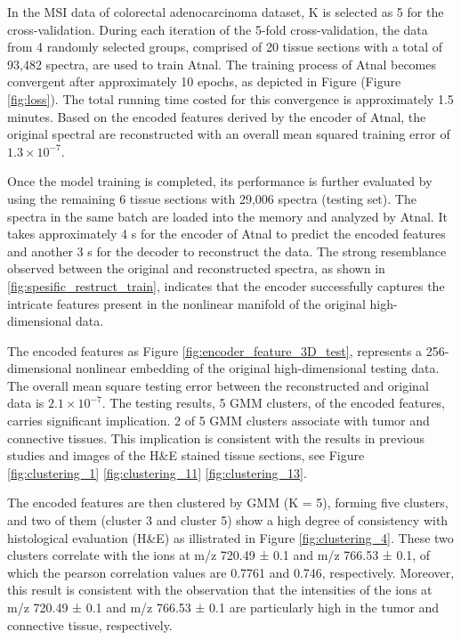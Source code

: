 \documentclass[journal=jacsat,manuscript=article]{achemso}
\begin{document}
In the MSI data of colorectal adenocarcinoma
dataset, K is selected as 5 for the cross-validation. During 
each iteration of the 5-fold cross-validation, the data from 4 randomly selected groups, 
comprised of 20 tissue sections with a total of 93,482 spectra, 
are used to train Atnal. 
The training process of Atnal becomes convergent after approximately 10 epochs, 
as depicted in Figure (Figure \ref{fig:loss}). The total running time costed for this 
convergence is approximately 1.5 minutes. Based on the encoded features derived by 
the encoder of Atnal, the original spectral are 
reconstructed with an overall mean squared training error of $1.3 \times 10^{-7}$. 

Once the model training is completed, its performance is further evaluated by 
using the remaining 6 tissue sections with 29,006 spectra (testing set).
The spectra in the same batch 
are loaded into the memory and analyzed by Atnal. 
It takes approximately 4 s for the encoder of Atnal
to predict the encoded features and another 3 s for the decoder 
to reconstruct the data. 
The strong resemblance observed between the original and reconstructed spectra, 
as shown in \ref{fig:spesific_restruct_train}, indicates that the encoder 
successfully captures the intricate features present in the nonlinear 
manifold of the original high-dimensional data.

The encoded features as Figure \ref{fig:encoder_feature_3D_test}, represents a 
256-dimensional nonlinear embedding of the original high-dimensional testing data. 
The overall mean square testing error between the reconstructed and original data
is  $2.1 \times 10^{-7}$. 
The testing results, 5 GMM clusters, of the encoded features, carries significant 
implication. 2 of 5 GMM clusters associate with tumor and connective tissues. 
This implication is consistent with the results in previous studies 
\cite{abdelmoula2018interactive} \cite{oetjen2015benchmark} 
and images of the H\&E stained tissue sections,  see 
Figure \ref{fig:clustering_1} \ref{fig:clustering_11} \ref{fig:clustering_13}. 

The encoded features are then clustered by GMM (K = 5), forming five clusters, 
and two of them (cluster 3 and cluster 5) show
a high degree of consistency with 
histological evaluation (H\&E) as illistrated in Figure \ref{fig:clustering_4}. 
These two clusters correlate with 
the ions at m/z 720.49 ± 0.1 and m/z 766.53 ± 0.1, of which the  pearson correlation 
values are 0.7761 and 0.746, respectively.
Moreover, this result is consistent with the observation that 
the intensities of the ions at m/z 720.49 ± 0.1 and m/z 766.53 ± 0.1 are 
particularly high in the tumor and connective tissue, respectively. 
\end{document}
